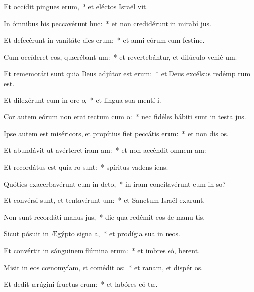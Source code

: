 \item Et occídit pingues erum,~* et eléctos Israël vit.
\item In ómnibus his peccavérunt huc:~* et non credidérunt in mirabí jus.
\item Et defecérunt in vanitáte dies erum:~* et anni eórum cum festine.
\item Cum occíderet eos, quærébant um:~* et revertebántur, et dilúculo venié  um.
\item Et rememoráti sunt quia Deus adjútor est erum:~* et Deus excélsus redémp rum est.
\item Et dilexérunt eum in ore o,~* et lingua sua mentí  i.
\item Cor autem eórum non erat rectum cum o:~* nec fidéles hábiti sunt in testa jus.
\item Ipse autem est miséricors, et propítius fiet peccátis erum:~* et non dis os.
\item Et abundávit ut avérteret iram am:~* et non accéndit omnem  am:
\item Et recordátus est quia ro sunt:~* spíritus vadens   iens.
\item Quóties exacerbavérunt eum in deto,~* in iram concitavérunt eum in so?
\item Et convérsi sunt, et tentavérunt um:~* et Sanctum Israël exarunt.
\item Non sunt recordáti manus jus,~* die qua redémit eos de manu tis.
\item Sicut pósuit in Ægýpto signa a,~* et prodígia sua in  neos.
\item Et convértit in sánguinem flúmina erum:~* et imbres eó,  berent.
\item Misit in eos cœnomyíam, et comédit os:~* et ranam, et dispér os.
\item Et dedit ærúgini fructus erum:~* et labóres eó tæ.

